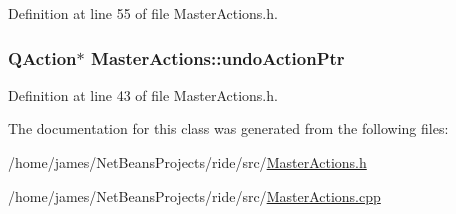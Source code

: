Definition at line 55 of file Master\-Actions.\-h.

\hypertarget{class_master_actions_a23386959a2f60a89cc6ae1bff012c76c}{
\subsubsection[{undo\-Action\-Ptr}]{\setlength{\rightskip}{0pt plus 5cm}Q\-Action$\ast$ Master\-Actions\-::undo\-Action\-Ptr\hspace{0.3cm}{\ttfamily [private]}}}\label{class_master_actions_a23386959a2f60a89cc6ae1bff012c76c}


Definition at line 43 of file Master\-Actions.\-h.



The documentation for this class was generated from the following files\-:\begin{DoxyCompactItemize}
\item 
/home/james/\-Net\-Beans\-Projects/ride/src/\hyperlink{_master_actions_8h}{Master\-Actions.\-h}\item 
/home/james/\-Net\-Beans\-Projects/ride/src/\hyperlink{_master_actions_8cpp}{Master\-Actions.\-cpp}\end{DoxyCompactItemize}
